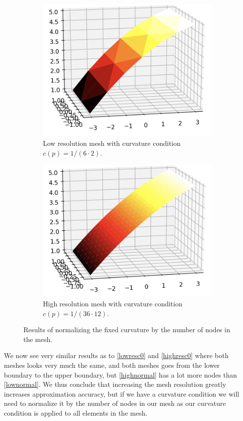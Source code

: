 \begin{figure}[H]
	\centering
	\begin{subfigure}[b]{0.49\linewidth}
		\centering
		\includegraphics[width=\linewidth]{Materials/lownormal}
		\caption{Low resolution mesh with curvature condition $c(p) = 1 / (6\cdot 2)$.}
		\label{lownormal}
	\end{subfigure}
	\hfill
	\begin{subfigure}[b]{0.49\linewidth}
		\centering
		\includegraphics[width=\linewidth]{Materials/highnormal}
		\caption{High resolution mesh with curvature condition $c(p) = 1 / (36\cdot 12)$.}
		\label{highnormal}
	\end{subfigure}
	\caption{Results of normalizing the fixed curvature by the number of nodes in the mesh.}
	\label{normalizedcurvature}
\end{figure}
We now see very similar results as to \autoref{lowresc0} and \autoref{highresc0} where both meshes looks very much the same, and both meshes goes from the lower boundary to the upper boundary, but \autoref{highnormal} has a lot more nodes than \autoref{lownormal}. We thus conclude that increasing the mesh resolution greatly increases approximation accuracy, but if we have a curvature condition we will need to normalize it by the number of nodes in our mesh as our curvature condition is applied to all elements in the mesh.